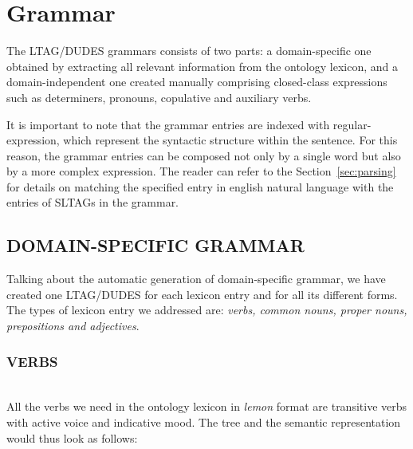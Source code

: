 \section{Grammar}
\label{sec:grammar}

The LTAG/DUDES grammars consists of two parts: a domain-specific one obtained by extracting all relevant information from the ontology lexicon, and a domain-independent one created manually comprising closed-class expressions such as determiners, pronouns, copulative and auxiliary verbs.

It is important to note that the grammar entries are indexed with regular-expression, which represent the syntactic structure within the sentence. For this reason, the grammar entries can be composed not only by a single word but also by a more complex expression. The reader can refer to the Section~\ref{sec:parsing} for details on matching the specified entry in english natural language with the entries of SLTAGs in the grammar.

\subsection{DOMAIN-SPECIFIC GRAMMAR}
Talking about the automatic generation of domain-specific grammar, we have created one LTAG/DUDES for each lexicon entry and for all its different forms. The types of lexicon entry we addressed are: \textit{verbs, common nouns, proper nouns, prepositions and adjectives}.

\subsubsection{VERBS}\mbox{}\\
All the verbs we need in the ontology lexicon in \textit{lemon} format are transitive verbs with active voice and indicative mood. The tree and the semantic representation would thus look as follows:

